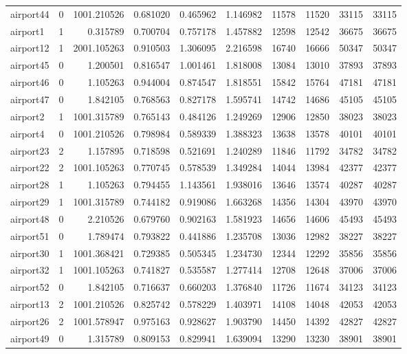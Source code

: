 \begin{longtable}{|l|r|r|r|r|r|r|r|r|r|}
airport44 & 0 & 1001.210526 & 0.681020 & 0.465962 & 1.146982 & 11578 & 11520 & 33115 & 33115 \\
airport1 & 1 & 0.315789 & 0.700704 & 0.757178 & 1.457882 & 12598 & 12542 & 36675 & 36675 \\
airport12 & 1 & 2001.105263 & 0.910503 & 1.306095 & 2.216598 & 16740 & 16666 & 50347 & 50347 \\
airport45 & 0 & 1.200501 & 0.816547 & 1.001461 & 1.818008 & 13084 & 13010 & 37893 & 37893 \\
airport46 & 0 & 1.105263 & 0.944004 & 0.874547 & 1.818551 & 15842 & 15764 & 47181 & 47181 \\
airport47 & 0 & 1.842105 & 0.768563 & 0.827178 & 1.595741 & 14742 & 14686 & 45105 & 45105 \\
airport2 & 1 & 1001.315789 & 0.765143 & 0.484126 & 1.249269 & 12906 & 12850 & 38023 & 38023 \\
airport4 & 0 & 1001.210526 & 0.798984 & 0.589339 & 1.388323 & 13638 & 13578 & 40101 & 40101 \\
airport23 & 2 & 1.157895 & 0.718598 & 0.521691 & 1.240289 & 11846 & 11792 & 34782 & 34782 \\
airport22 & 2 & 1001.105263 & 0.770745 & 0.578539 & 1.349284 & 14044 & 13984 & 42377 & 42377 \\
airport28 & 1 & 1.105263 & 0.794455 & 1.143561 & 1.938016 & 13646 & 13574 & 40287 & 40287 \\
airport29 & 1 & 1001.315789 & 0.744182 & 0.919086 & 1.663268 & 14356 & 14304 & 43970 & 43970 \\
airport48 & 0 & 2.210526 & 0.679760 & 0.902163 & 1.581923 & 14656 & 14606 & 45493 & 45493 \\
airport51 & 0 & 1.789474 & 0.793822 & 0.441886 & 1.235708 & 13036 & 12982 & 38227 & 38227 \\
airport30 & 1 & 1001.368421 & 0.729385 & 0.505345 & 1.234730 & 12344 & 12292 & 35856 & 35856 \\
airport32 & 1 & 1001.105263 & 0.741827 & 0.535587 & 1.277414 & 12708 & 12648 & 37006 & 37006 \\
airport52 & 0 & 1.842105 & 0.716637 & 0.660203 & 1.376840 & 11726 & 11674 & 34123 & 34123 \\
airport13 & 2 & 1001.210526 & 0.825742 & 0.578229 & 1.403971 & 14108 & 14048 & 42053 & 42053 \\
airport26 & 2 & 1001.578947 & 0.975163 & 0.928627 & 1.903790 & 14450 & 14392 & 42827 & 42827 \\
airport49 & 0 & 1.315789 & 0.809153 & 0.829941 & 1.639094 & 13290 & 13230 & 38901 & 38901 \\

\end{longtable}
